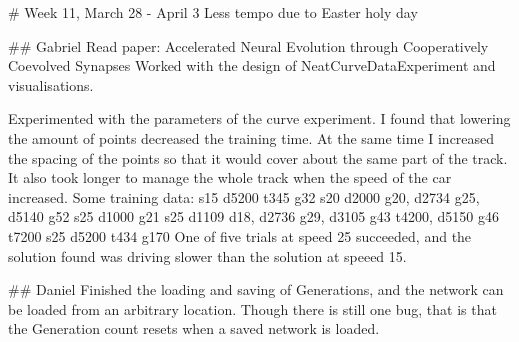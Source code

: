 # Week 11, March 28 - April 3
Less tempo due to Easter holy day

## Gabriel 
Read paper: Accelerated Neural Evolution through Cooperatively Coevolved Synapses
Worked with the design of NeatCurveDataExperiment and visualisations.

Experimented with the parameters of the curve experiment. I found that lowering the amount of points decreased the training time. At the same time I increased the spacing of the points so that it would cover about the same part of the track. It also took longer to manage the whole track when the speed of the car increased. Some training data:
s15 d5200 t345 g32
s20 d2000 g20, d2734 g25, d5140 g52 
s25 d1000 g21
s25 d1109 d18, d2736 g29, d3105 g43 t4200, d5150 g46 t7200
s25 d5200 t434 g170
One of five trials at speed 25 succeeded, and the solution found was driving slower than the solution at speeed 15. 

## Daniel
Finished the loading and saving of Generations, and the network can be loaded from an arbitrary location. Though there is still one bug, that is that the Generation count resets when a saved network is loaded.
